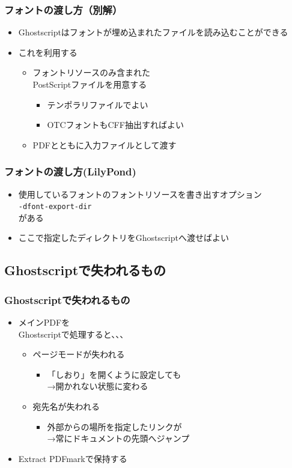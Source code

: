 \documentclass[unicode,17pt]{beamer}
\begin{document}
\begin{frame}\frametitle{フォントの渡し方（別解）}
  \begin{itemize}
  \item Ghostscriptはフォントが埋め込まれたファイルを読み込むことができる
  \item これを利用する
    \begin{itemize}
    \item フォントリソースのみ含まれた\\
      PostScriptファイルを用意する
      \begin{itemize}
      \item テンポラリファイルでよい
      \item OTCフォントもCFF抽出すればよい
      \end{itemize}
    \item PDFとともに入力ファイルとして渡す
    \end{itemize}
  \end{itemize}
\end{frame}

\begin{frame}[fragile]\frametitle{フォントの渡し方(LilyPond)}
  \begin{itemize}
  \item 使用しているフォントのフォントリソースを書き出すオプション \\
    {\small\verb|-dfont-export-dir|} \\
    がある
  \item ここで指定したディレクトリをGhostscriptへ渡せばよい
  \end{itemize}
\end{frame}

\subsection{Ghostscriptで失われるもの}
\begin{frame}\frametitle{Ghostscriptで失われるもの}
  \begin{itemize}
  \item メインPDFを\\
    Ghostscriptで処理すると、、、
    \begin{itemize}
    \item ページモードが失われる
      \begin{itemize}
      \item 「しおり」を開くように設定しても \\
        →開かれない状態に変わる
      \end{itemize}
    \item 宛先名が失われる
      \begin{itemize}
      \item 外部からの場所を指定したリンクが\\
        →常にドキュメントの先頭へジャンプ
      \end{itemize}
    \end{itemize}
  \item Extract PDFmarkで保持する
  \end{itemize}
\end{frame}
\end{document}
